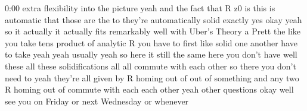 \begin{unfinished}{0:00}
extra  flexibility  into  the  picture  yeah
and  the  fact  that  R  z0  is  this  is
automatic  that  those  are  the
to  they're  automatically  solid  exactly
yes  okay
yeah  so  it  actually  it  actually  fits
remarkably  well  with  Uber's  Theory
a  Prett  the  like  you  take  tens  product
of  analytic  R  you  have  to  first  like
solid  one  another  have  to  take  yeah  yeah
usually  yeah  so  here  it  still  the  same
here  you  don't  have
well  these  all  these  solidifications  all
all  commute  with  each  other  so  there  you
don't  need
to  yeah  they're  all  given  by  R  homing
out  of  out  of  something  and  any  two  R
homing  out  of  commute  with  each  each
other
yeah  other
questions  okay  well  see  you  on  Friday  or
next  Wednesday  or
whenever
\end{unfinished}